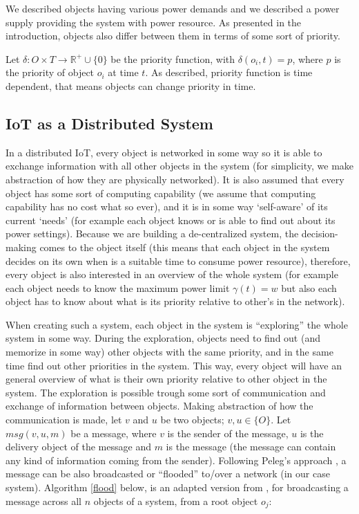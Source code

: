 \documentclass[../main/IoT.tex]{subfiles}
\begin{document}
We described objects having various power demands and we described a power supply providing the system with power resource. As presented in the introduction, objects also differ between them in terms of some sort of priority.

Let $\delta:O\times T\rightarrow\mathbb{R^+}\cup\{0\}$ be the priority function, with $\delta(o_{i}, t)= p$, where $p$ is the priority of object $o_{i}$ at time $t$. As described, priority function is time dependent, that means objects can change priority in time.

\subsection{IoT as a Distributed System}

In a distributed IoT, every object is networked in some way so it is able to exchange information with all other objects in the system (for simplicity, we make abstraction of how they are physically networked). It is also assumed that every object has some sort of computing capability (we assume that computing capability has no cost what so ever), and it is in some way `self-aware' of its current `needs' (for example each object knows or is able to find out about its power settings). Because we are building a de-centralized system, the decision-making comes to the object itself (this means that each object in the system decides on its own when is a suitable time to consume power resource), therefore, every object is also interested in an overview of the whole system (for example each object needs to know the maximum power limit $\gamma(t)= w$ but also each object has to know about what is its priority relative to other's in the network).

When creating such a system, each object in the system is ``exploring'' the whole system in some way. During the exploration, objects need to find out (and memorize in some way) other objects with the same priority, and in the same time find out other priorities in the system. This way, every object will have an general overview of what is their own priority relative to other object in the system. The exploration is possible trough some sort of communication and exchange of information between objects. Making abstraction of how the communication is made, let $v$ and $u$ be two objects; $v,u \in\{O\}$. Let $msg(v,u,m)$ be a message, where $v$ is the sender of the message, $u$ is the delivery object of the message and $m$ is the message (the message can contain any kind of information coming from the sender). Following Peleg's approach \cite{peleg2000distributed}, a message can be also broadcasted or ``flooded'' to/over a network (in our case system). Algorithm \ref{flood} below, is an adapted version from \cite{peleg2000distributed}, for broadcasting a message across all $n$ objects of a system, from a root object $o_{j}$:
\end{document}
